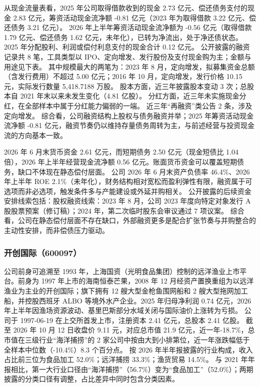  从现金流量表看，2025 年公司取得借款收到的现金 2.73 亿元、偿还债务支付的现金 2.83 亿元，筹资活动现金流净额 -0.81 亿元（2023 年为取得借款 3.22 亿元、偿还债务 3.21 亿元）。 2026 年上半年筹资活动现金流净额为 -0.56 亿元（取得借款 1.79 亿元、偿还债务 1.62 亿元，未年化），已转为净流出，处于净还债状态。 2025 年分配股利、利润或偿付利息支付的现金合计 0.12 亿元。 公开披露的融资记录共 8 笔，工具类型以 IPO、定向增发、发行股份及支付现金购为主；金额与用途见下表。 其中规模最大的两笔为：2023 年 8 月，定向增发，拟募集资金总额（含发行费用）不超过 5.00 亿元；2016 年 10 月，定向增发，发行价格 10.15 元，实际发行数量 5,418.7188 万股。 股本方面，近三年披露股本变动 3 次；总股本自 2021 年末以来未发生变化（4.81 亿股）。 分红方面，近三年未实施现金分红，在全部样本中属于分红能力偏弱的一端。 近三年“再融资”类公告 2 条，涉及定向增发。 综合看，公司融资结构上股权与债务融资并举；2025 年筹资活动现金流净额 -0.81 亿元，融资节奏仍以维持存量债务周转为主，与前述经营与投资现金流的方向基本一致。

 2026 年 6 月末货币资金 2.61 亿元，而短期债务 2.50 亿元（现金短债比 1.04 倍），2026 年上半年经营现金流净额 0.56 亿元。账面货币资金可以覆盖短期债务，缺口不体现在静态偿付层面。 公司 2026 年 6 月末资产负债率 46.4\%、2026 年上半年 ROE 2.1\%（未年化），财务结构相对宽松而盈利弹性有限，融资属于可选项而非必选项，触发条件多与产能建设或外延并购相关。 公开披露的后续资金安排线索包括：股权融资线索：2023 年 8 月，公司 2023 年度向特定对象发行 A 股股票预案（修订稿）；2024 年，第二次临时股东会审议通过 7 项议案。 综合看，公司在静态偿付层面不存在缺口，外部融资更多是配合扩张节奏与并购整合的主动性安排，而非偿债压力驱动。




\subsubsection{开创国际（600097）}
\label{co:600097}

 公司前身可追溯至 1993 年，上海国资（光明食品集团）控制的远洋渔业上市平台。前身为 1997 年上市的海南恒泰芒果，2008 年 12 月经资产置换重组为以远洋渔业为主业的开创国际；旗下拥有 12 艘大型金枪鱼围网船和 2 艘大型拖网加工船，并控股西班牙 ALBO 等境外水产企业。2025 年归母净利润 0.74 亿元，2026 年上半年因渔场资源波动、基里巴斯部分水域关闭与国际油价上涨转为亏损。 公司于 1997-06-19 在上交所首发上市，注册资本 2.41 亿元，总股本 2.41 亿股。 截至 2026 年 10 月 12 日收盘价 9.11 元，对应总市值 21.9 亿元，近一年-18.7\%，总市值在三级行业“海洋捕捞”的 2 家公司中按由大到小排第位，近一年涨跌幅低于全样本中位数（-10.4\%）8.3 个百分点。 按 2026 年半年报披露的行业构成，收入占比前三位为食品加工 52.0\%；远洋捕捞 33.3\%；渔货贸易 14.5\%。 与 2021 年年报相比，第一大行业口径由“海洋捕捞”（56.7\%）变为“食品加工”（52.0\%）；两期披露的分类口径有调整，占比差异中同时包含分类因素。

